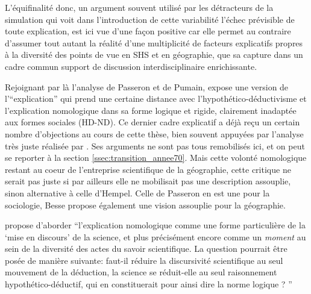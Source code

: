 L'équifinalité donc, un argument souvent utilisé par les détracteurs de la simulation qui voit dans l'introduction de cette variabilité l'échec prévisible de toute explication, est ici vue d'une façon positive car elle permet au contraire d'assumer tout autant la réalité d'une multiplicité de facteurs explicatifs propres à la diversité des points de vue en SHS et en géographie, que sa capture dans un cadre commun support de discussion interdisciplinaire enrichissante.

Rejoignant par là l'analyse de Passeron et de Pumain, \textcite{Besse2000} expose une version de l'\enquote{explication} qui prend une certaine distance avec l'hypothético-déductivisme et l'explication nomologique dans sa forme logique et rigide, clairement inadaptée aux formes sociales (HD-ND). Ce dernier cadre explicatif a déjà reçu un certain nombre d'objections au cours de cette thèse, bien souvent appuyées par l'analyse très juste réalisée par \textcite{Besse2000}. Ses arguments ne sont pas tous remobilisés ici, et on peut se reporter à la section \ref{ssec:transition_annee70}. Mais cette volonté nomologique restant au coeur de l'entreprise scientifique de la géographie, cette critique ne serait pas juste si par ailleurs elle ne mobilisait pas une description assouplie, sinon alternative à celle d'Hempel. Celle de Passeron en est une pour la sociologie, Besse propose également une vision assouplie pour la géographie.

\textcite{Besse2000} propose d'aborder \enquote{l'explication nomologique comme une forme particulière de la \enquote{mise en discours} de la science, et plus précisément encore comme un \textit{moment} au sein de la diversité des actes du savoir scientifique. La question pourrait être posée de manière suivante: faut-il réduire la discursivité scientifique au seul mouvement de la déduction, la science se réduit-elle au seul raisonnement hypothético-déductif, qui en constituerait pour ainsi dire la norme logique ? }

